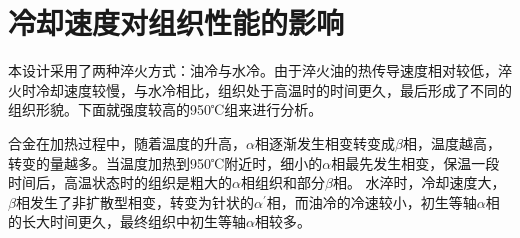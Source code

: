 \section{冷却速度对组织性能的影响}
本设计采用了两种淬火方式：油冷与水冷。由于淬火油的热传导速度相对较低，淬火时冷却速度较慢，与水冷相比，组织处于高温时的时间更久，最后形成了不同的组织形貌。下面就强度较高的950℃组来进行分析。

合金在加热过程中，随着温度的升高，$\alpha$相逐渐发生相变转变成$\beta$相，温度越高，转变的量越多。当温度加热到950℃附近时，细小的$\alpha$相最先发生相变，保温一段时间后，高温状态时的组织是粗大的$\alpha$相组织和部分$\beta$相。
水淬时，冷却速度大，$\beta$相发生了非扩散型相变，转变为针状的$\alpha^\prime$相，而油冷的冷速较小，初生等轴$\alpha$相的长大时间更久，最终组织中初生等轴$\alpha$相较多。


